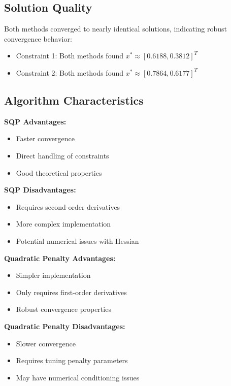 \documentclass[11pt,a4paper]{article}
\begin{document}
\subsection{Solution Quality}
Both methods converged to nearly identical solutions, indicating robust convergence behavior:
\begin{itemize}
    \item Constraint 1: Both methods found $x^* \approx [0.6188, 0.3812]^T$
    \item Constraint 2: Both methods found $x^* \approx [0.7864, 0.6177]^T$
\end{itemize}

\subsection{Algorithm Characteristics}

\textbf{SQP Advantages:}
\begin{itemize}
    \item Faster convergence
    \item Direct handling of constraints
    \item Good theoretical properties
\end{itemize}

\textbf{SQP Disadvantages:}
\begin{itemize}
    \item Requires second-order derivatives
    \item More complex implementation
    \item Potential numerical issues with Hessian
\end{itemize}

\textbf{Quadratic Penalty Advantages:}
\begin{itemize}
    \item Simpler implementation
    \item Only requires first-order derivatives
    \item Robust convergence properties
\end{itemize}

\textbf{Quadratic Penalty Disadvantages:}
\begin{itemize}
    \item Slower convergence
    \item Requires tuning penalty parameters
    \item May have numerical conditioning issues
\end{itemize}
\end{document}
